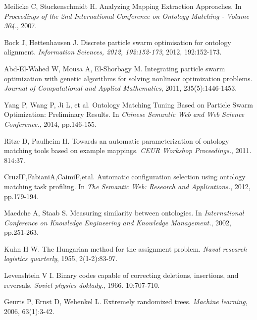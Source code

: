 \documentclass[twoside]{article}
\begin{document}
\begin{multicols}{2}
\begin{thebibliography}{99}
Meilicke C, Stuckenschmidt H. Analyzing Mapping Extraction Approaches. In {\it Proceedings of the 2nd International Conference on Ontology Matching - Volume 304.}, 2007.

Bock J, Hettenhausen J. Discrete particle swarm optimisation for ontology alignment. {\it Information Sciences, 2012, 192:152-173}, 2012, 192:152-173.

Abd-El-Wahed W, Mousa A, El-Shorbagy M. Integrating particle swarm optimization with genetic algorithms for solving nonlinear optimization problems. {\it Journal of Computational and Applied Mathematics}, 2011, 235(5):1446-1453.

Yang P, Wang P, Ji L, et al. Ontology Matching Tuning Based on Particle Swarm Optimization: Preliminary Results. In {\it Chinese Semantic Web and Web Science Conference.}, 2014, pp.146-155.

Ritze D, Paulheim H. Towards an automatic parameterization of ontology matching tools based on example mappings. {\it CEUR Workshop Proceedings.}, 2011. 814:37.

CruzIF,FabianiA,CaimiF,etal. Automatic configuration selection using ontology matching task profiling. In {\it The Semantic Web: Research and Applications.}, 2012, pp.179-194.

Maedche A, Staab S. Measuring similarity between ontologies. In {\it International Conference on Knowledge Engineering and Knowledge Management.}, 2002, pp.251-263.

Kuhn H W. The Hungarian method for the assignment problem. {\it Naval research logistics quarterly}, 1955, 2(1-2):83-97.

Levenshtein V I. Binary codes capable of correcting deletions, insertions, and reversals. {\it Soviet physics doklady.}, 1966. 10:707-710.

Geurts P, Ernst D, Wehenkel L. Extremely randomized trees. {\it Machine learning},  2006, 63(1):3-42.


\end{thebibliography}

\label{last-page}
\end{multicols}
\label{last-page}
\end{document}

